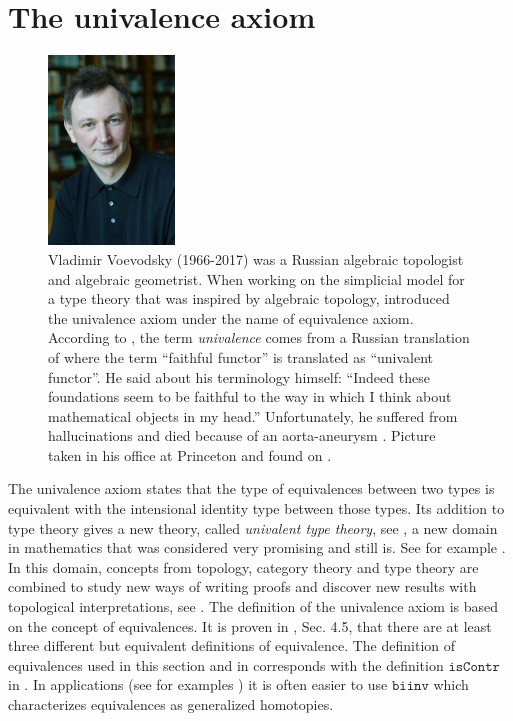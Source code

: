\documentclass[12pt,a4paper,twoside,xetex]{book} %
\newcommand{\keyword}[1]{\emph{#1}\index{#1}}
\newcommand{\op}[1]{\mathtt{#1}}
\begin{document}
\section{The univalence axiom}

\begin{figure}
\begin{center}
\includegraphics[width=0.3\textwidth]{figures/Voevodsky}
\par\end{center}
\caption{\label{fig:Vladimir-Voevodsky-1966-2017}
  Vladimir Voevodsky (1966-2017)  was a Russian
algebraic topologist and algebraic geometrist. When 
working on the simplicial model for a type theory that was inspired by 
algebraic topology, \cite{Voevodsky2010a} introduced the univalence axiom under 
the name of equivalence axiom. According to \cite{Voevodsky2014}, the term \keyword{univalence} comes from a 
Russian translation of \cite{Boardman2006} where  the term
\textquotedblleft faithful functor\textquotedblright{} is translated
as \textquotedblleft univalent functor\textquotedblright . He said about his terminology himself: ``Indeed these foundations seem 
to be faithful to the way in which I think about mathematical objects in my 
head.''
 Unfortunately, he suffered from hallucinations \cite{Baez2017} and died 
because of an aorta-aneurysm \cite{Rehmeyer2017}. Picture taken in his office at Princeton and found on \cite{Grayson2017}.}
\end{figure}

The univalence axiom states that the type of equivalences between two types is 
equivalent with the intensional identity type between those types. Its addition 
to type theory gives a new theory, called \keyword{univalent type theory}, see 
, a new domain in mathematics that was considered very 
promising and still is. See for example \cite{shulman_2018}. In this domain, concepts from topology, category theory 
and type theory  are combined to study new ways of writing proofs and discover 
new results with topological interpretations, see 
. The definition of the univalence axiom is based on the 
concept of equivalences. It is proven in \cite{Voevodsky2013}, Sec. 4.5, 
that there are at least three different but equivalent definitions of 
equivalence. The definition of equivalences used in this section and in 
\cite{Pelayo2014} corresponds with the definition $\op{isContr}$ in 
\cite{Voevodsky2013}. In applications (see for examples ) it 
is often easier to use $\op{biinv}$ which characterizes equivalences as
generalized homotopies.
\end{document}
